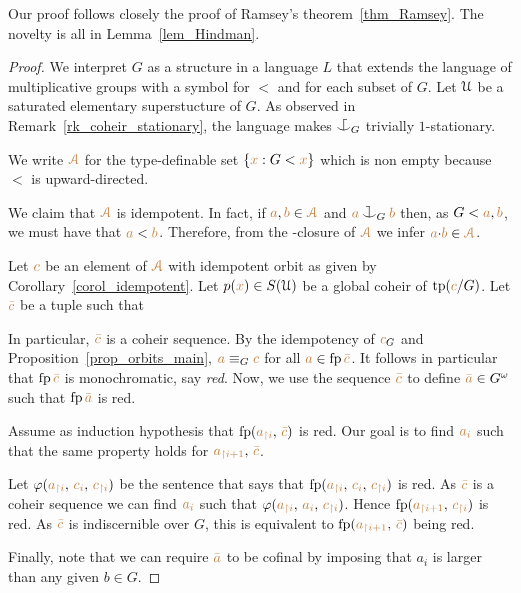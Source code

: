 \documentclass[creche.tex]{subfiles}
\begin{document}
Our proof follows closely the proof of Ramsey's theorem~\ref{thm_Ramsey}.
The novelty is all in Lemma~\ref{lem_Hindman}.

\begin{proof}
We interpret $G$ as a structure in a language $L$ 
that extends the language of multiplicative groups 
with a symbol for $<$ and for each subset of $G$.
Let $\EuScript U$ be a saturated elementary superstucture of $G$.
As observed in Remark~\ref{rk_coheir_stationary}, 
the language makes $\nonforkc_G$ trivially $1$-stationary.

We write ${\color{brown}\EuScript A}$ for the type-definable set $\{{\color{brown} x} : G<{\color{brown} x}\}$ which is non empty because $<$ is upward-directed.

We claim that ${\color{brown}\EuScript A}$ is idempotent. 
In fact, if ${\color{brown} a},{\color{brown} b}\in{\color{brown}\EuScript A}$ and ${\mr a}\cnonfork_G{\mr b}$ 
then, as $G<{\color{brown} a},{\color{brown} b}$, we must have that ${\color{brown} a}<{\color{brown} b}$. 
Therefore, from the \dotlt-closure of ${\color{brown}{\EuScript A}}$ we infer ${\color{brown} a}{\cdot}{\color{brown} b}\in{\color{brown}\EuScript A}$.

Let ${\color{brown} c}$ be an element of ${\color{brown}{\EuScript A}}$ with idempotent orbit as given by Corollary~\ref{corol_idempotent}.
Let $p({\color{brown} x})\in S(\EuScript U)$ be a global coheir of ${\rm tp}({\color{brown} c}/G)$.
Let ${\color{brown}\bar c}$ be a tuple such that


In particular, ${\color{brown}\bar c}$ is a coheir sequence. 
By the idempotency of ${\color{brown} c}_G$ and Proposition~\ref{prop_orbits_main}, 
${\color{brown} a}\equiv_G{\color{brown} c}$ for all ${\color{brown} a}\in {\rm fp}\,{\color{brown}\bar c}$.
It follows in particular that ${\rm fp}\,{\color{brown}\bar c}$ is monochromatic, say \textit{red}.
Now, we use the sequence ${\color{brown}\bar c}$ to define ${\color{brown}\bar a}\in G^\omega$
such that ${\rm fp}\,{\color{brown}\bar a}$ is red.

Assume as induction hypothesis that ${\rm fp}({\color{brown} a_{\restriction i}},\,{\color{brown}\bar c})$ is red.
Our goal is to find ${\color{brown} a_i}$ such that the same property holds for ${\color{brown} a_{\restriction i+1}},\,{\color{brown}\bar c}$.

Let $\varphi({\color{brown} a_{\restriction i}},\,{\color{brown} c_i},\,{\color{brown} c_{\restriction i}})$ 
be the sentence that says that 
${\rm fp}({\color{brown} a_{\restriction i}},\,{\color{brown} c_i},\,{\color{brown} c_{\restriction i}})$ is red.
As ${\color{brown}\bar c}$ is a coheir sequence we can find  ${\color{brown} a_i}$ 
such that $\varphi({\color{brown} a_{\restriction i}},\,{\color{brown} a_i},\,{\color{brown} c_{\restriction i}})$.
Hence ${\rm fp}({\color{brown} a_{\restriction i+1}},\,{\color{brown} c_{\restriction i}})$ is red.
As ${\color{brown}\bar c}$ is indiscernible over $G$, 
this is equivalent to ${\rm fp}({\color{brown} a_{\restriction i+1}},\,{\color{brown}\bar c})$ being red.

Finally, note that we can require ${\color{brown}\bar a}$ to be cofinal 
by imposing that $a_i$ is larger than any given $b\in G$.
\end{proof}
\end{document}
